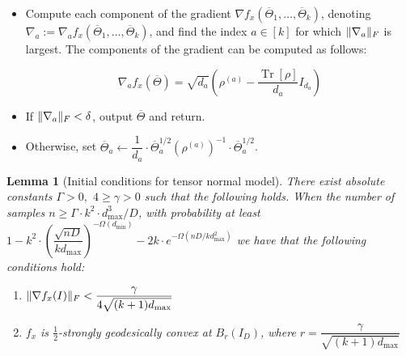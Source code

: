 \documentclass[aos]{imsart}
\newtheorem{lemma}[theorem]{Lemma}
\theoremstyle{definition}
\numberwithin{equation}{section}
\DeclareMathOperator{\tr}{Tr}
\DeclarePairedDelimiter{\norm}{\lVert}{\rVert}
\newcommand{\otheta}{\overline{\Theta}}
\newcommand{\samp}{x}
\def\dmin{d_{\min}}
\def\dmax{d_{\max}}
\begin{document}
\begin{Algorithm}
\begin{enumerate}
\begin{itemize}
\item Compute each component of the gradient $\nabla f_{\samp}(\otheta_1, \ldots, \otheta_k)$, denoting $\nabla_a := \nabla_a f_{\samp}(\otheta_1, \ldots, \otheta_k)$, and find the index $a \in [k]$ for which $\norm{\nabla_a}_F$ is largest.
The components of the gradient can be computed as follows:

$$ \nabla_a f_x(\otheta) = \sqrt{d_a} \left( \rho^{(a)} - \dfrac{\tr[\rho]}{d_a} I_{d_a} \right) $$

\vspace{5pt}

\item
If $\norm{\nabla_a}_F < \delta$, output $\otheta$ and return.

\vspace{5pt}

\item Otherwise, set $\otheta_a \leftarrow  \dfrac{1}{d_a} \cdot \otheta_a^{1/2} (\rho^{(a)})^{-1} \cdot \otheta_a^{1/2}$.
\end{itemize}
\end{enumerate}
\caption{Tensor flip-flop algorithm}\label{alg:tensor-flip-flop}
\end{Algorithm}




\begin{lemma}[Initial conditions for tensor normal model]\label{lem:tensor-initial-conditions}
	There exist absolute constants $\Gamma > 0,$ $4 \geq \gamma > 0$ such that the following holds.
	When the number of samples $n \geq \Gamma \cdot k^2 \cdot \dmax^3/D$, with probability at least $1 - k^2 \cdot \left( \dfrac{\sqrt{nD}}{k \dmax} \right)^{-\Omega(\dmin)} - 2k \cdot e^{- \Omega(nD/k \dmax^2)}$ we have that the following conditions hold:
	\begin{enumerate}
		\item $\norm{\nabla f_x(I)}_F < \dfrac{\gamma}{4 \sqrt{(k+1)\dmax}}$
		\item $f_x$ is $\frac{1}{2}$-strongly geodesically convex at
		$B_r(I_D)$, where $r = \dfrac{\gamma}{\sqrt{(k+1) \dmax}}$
	\end{enumerate}
\end{lemma}
\end{document}
